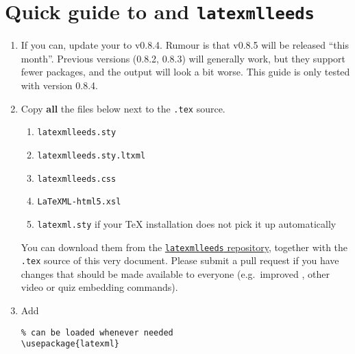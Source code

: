\documentclass[a4paper]{article}
\theoremstyle{definition}
\begin{document}
\tableofcontents

\section{Quick guide to \texorpdfstring{\LaTeXML{}}{LaTeXML} and \texttt{latexmlleeds}}
\begin{enumerate}
  \item If you can, update your \LaTeXML{} to v0.8.4. Rumour is that v0.8.5 will be released ``this month''. Previous versions (0.8.2, 0.8.3) will generally work, but they support fewer packages, and the output will look a bit worse. This guide is only tested with version 0.8.4.
  \item Copy \textbf{all} the files below next to the \verb|.tex| source.
  \begin{enumerate}
    \item \verb|latexmlleeds.sty|
    \item \verb|latexmlleeds.sty.ltxml|
    \item \verb|latexmlleeds.css|
    \item \verb|LaTeXML-html5.xsl|
    \item \verb|latexml.sty| if your \TeX{} installation does not pick it up automatically
  \end{enumerate}
  You can download them from the \href{https://dev.azure.com/pmtvlm-leeds-ac-uk/public/_git/latexmlleeds}{\texttt{latexmlleeds} repository}, together with the \verb|.tex| source of this very document. Please submit a pull request if you have changes that should be made available to everyone (e.g.\ improved \CSS{}, other video or quiz embedding commands).
  \item Add
  \begin{lstlisting}[style=latexml]
% for \iflatexml and other goodies
% can be loaded whenever needed
\usepackage{latexml}


\end{lstlisting}
\end{enumerate}
\end{document}
